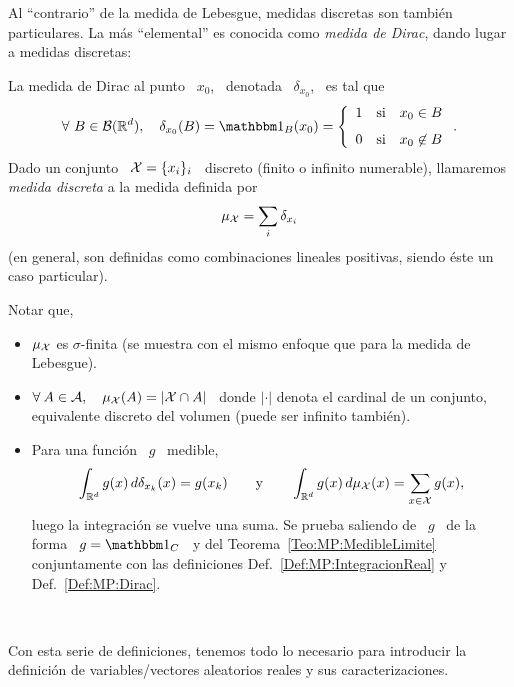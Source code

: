 Al  ``contrario'' de  la medida  de  Lebesgue, medidas  discretas son  tambi\'en
particulares. La  m\'as ``elemental''  es conocida como  {\it medida  de Dirac},
dando lugar a medidas discretas:
%
\begin{definicion}
\label{Def:MP:Dirac}
%
  La medida de Dirac al punto \ $x_0$, \ denotada \ $\delta_{x_0}$, \ es tal que
  \[
  \forall   \  B  \in   \B(\Rset^d),  \quad   \delta_{x_0}(B)  =   \un_B(x_0)  =
  \left\{ \begin{array}{ccc}
  1 & \mbox{si} & x_0 \in B\\[2.5mm]
  0 & \mbox{si} & x_0 \not\in B
  \end{array}\right..
  \]
  Dado un conjunto \ $\mathcal{X} = \{  x_i \}_i$ \ discreto (finito o infinito numerable),
  llamaremos {\it medida discreta} a la medida definida por
  \[
  \mu_{\mathcal{X}} = \sum_i \delta_{x_i}
  \]
  (en  general,  son definidas  como  combinaciones  lineales positivas,  siendo
  \'este un caso particular).
\end{definicion}
%
Notar que,
%
\begin{itemize}
%
\item $\mu_{\mathcal{X}}$ es  $\sigma$-finita (se muestra con el mismo  enfoque que para la
  medida de Lebesgue).
%
\item $\forall  \: A \in \mathcal{A},  \quad \mu_{\mathcal{X}}(A) =  |\mathcal{X} \cap A|$ \  donde $|\cdot|$
  denota el cardinal de un conjunto, equivalente discreto del volumen (puede ser
  infinito tambi\'en).
%
\item Para una funci\'on \ $g$ \ medible,
  \[
  \int_{\mathbb{R}^d} g(x) \, d\delta_{x_k}(x) = g(x_k) \qquad \mbox{y} \qquad
  \int_{\mathbb{R}^d} g(x) \, d\mu_{\mathcal{X}}(x) = \sum_{x \in \mathcal{X}} g(x),
  \]
  luego la integraci\'on se  vuelve una suma.  Se prueba saliendo de  \ $g$ \ de
  la   forma  \  $g   =  \un_C$   \  y   del  Teorema~\ref{Teo:MP:MedibleLimite}
  conjuntamente   con  las   definiciones   Def.~\ref{Def:MP:IntegracionReal}  y
  Def.~\ref{Def:MP:Dirac}.
\end{itemize}

\

Con esta  serie de  definiciones, tenemos todo  lo necesario para  introducir la
definici\'on de variables/vectores aleatorios reales y sus caracterizaciones.



\label{Ssec:MP:VAGeneral}

